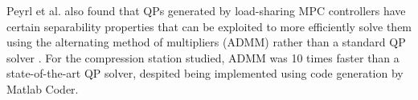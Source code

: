 Peyrl et al. also found that QPs generated by load-sharing MPC controllers have certain separability properties that can be exploited to more efficiently solve them using the alternating method of multipliers (ADMM) rather than a standard QP solver \cite{Peyrl2015}. For the compression station studied, ADMM was 10 times faster than a state-of-the-art QP solver, despited being implemented using code generation by Matlab Coder.




